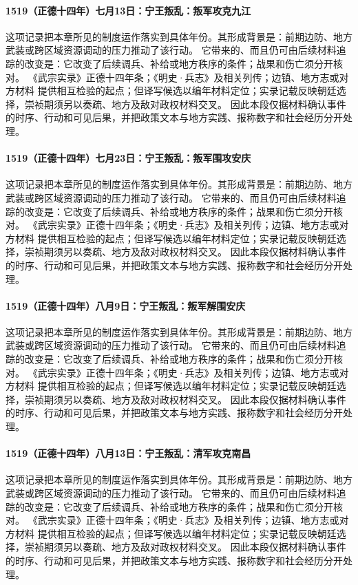 \paragraph{1519（正德十四年）七月13日：宁王叛乱：叛军攻克九江} 这项记录把本章所见的制度运作落实到具体年份。其形成背景是：前期边防、地方武装或跨区域资源调动的压力推动了该行动。 它带来的、而且仍可由后续材料追踪的改变是：它改变了后续调兵、补给或地方秩序的条件；战果和伤亡须分开核对。 《武宗实录》正德十四年条；《明史·兵志》及相关列传；边镇、地方志或对方材料 提供相互检验的起点；但译写候选以编年材料定位；实录记载反映朝廷选择，崇祯期须另以奏疏、地方及敌对政权材料交叉。 因此本段仅据材料确认事件的时序、行动和可见后果，并把政策文本与地方实践、报称数字和社会经历分开处理。

\paragraph{1519（正德十四年）七月23日：宁王叛乱：叛军围攻安庆} 这项记录把本章所见的制度运作落实到具体年份。其形成背景是：前期边防、地方武装或跨区域资源调动的压力推动了该行动。 它带来的、而且仍可由后续材料追踪的改变是：它改变了后续调兵、补给或地方秩序的条件；战果和伤亡须分开核对。 《武宗实录》正德十四年条；《明史·兵志》及相关列传；边镇、地方志或对方材料 提供相互检验的起点；但译写候选以编年材料定位；实录记载反映朝廷选择，崇祯期须另以奏疏、地方及敌对政权材料交叉。 因此本段仅据材料确认事件的时序、行动和可见后果，并把政策文本与地方实践、报称数字和社会经历分开处理。

\paragraph{1519（正德十四年）八月9日：宁王叛乱：叛军解围安庆} 这项记录把本章所见的制度运作落实到具体年份。其形成背景是：前期边防、地方武装或跨区域资源调动的压力推动了该行动。 它带来的、而且仍可由后续材料追踪的改变是：它改变了后续调兵、补给或地方秩序的条件；战果和伤亡须分开核对。 《武宗实录》正德十四年条；《明史·兵志》及相关列传；边镇、地方志或对方材料 提供相互检验的起点；但译写候选以编年材料定位；实录记载反映朝廷选择，崇祯期须另以奏疏、地方及敌对政权材料交叉。 因此本段仅据材料确认事件的时序、行动和可见后果，并把政策文本与地方实践、报称数字和社会经历分开处理。

\paragraph{1519（正德十四年）八月13日：宁王叛乱：清军攻克南昌} 这项记录把本章所见的制度运作落实到具体年份。其形成背景是：前期边防、地方武装或跨区域资源调动的压力推动了该行动。 它带来的、而且仍可由后续材料追踪的改变是：它改变了后续调兵、补给或地方秩序的条件；战果和伤亡须分开核对。 《武宗实录》正德十四年条；《明史·兵志》及相关列传；边镇、地方志或对方材料 提供相互检验的起点；但译写候选以编年材料定位；实录记载反映朝廷选择，崇祯期须另以奏疏、地方及敌对政权材料交叉。 因此本段仅据材料确认事件的时序、行动和可见后果，并把政策文本与地方实践、报称数字和社会经历分开处理。


